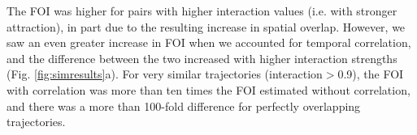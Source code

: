 \documentclass[letterpaper]{article}
\begin{document}
The FOI was higher for pairs with higher interaction values (i.e. with stronger attraction), in part due to the resulting increase in spatial overlap. %
However, we saw an even greater increase in FOI when we accounted for temporal correlation, and the difference between the two increased with higher interaction strengths (Fig. \ref{fig:simresults}a). For very similar trajectories (interaction$>$0.9), the FOI with correlation was more than ten times the FOI estimated without correlation, and there was a more than 100-fold difference for perfectly overlapping trajectories.  

\end{document}
